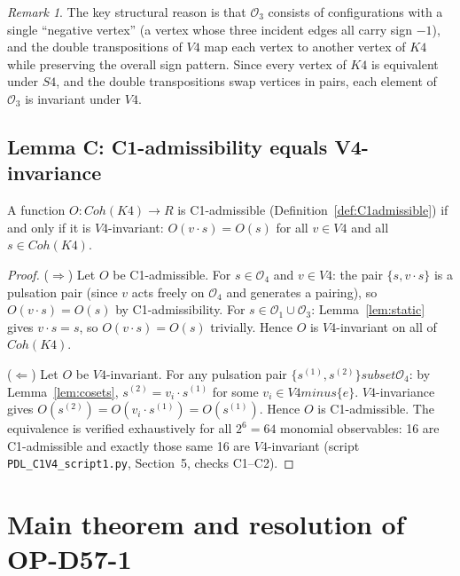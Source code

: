 \documentclass[11pt,a4paper]{article}
\def\Sfour{S4}%
\def\Vfour{V4}%
\def\Kfour{K4}%
\def\setminus{ minus }%
\def\subset{ subset }%
\def\mathbb#1{#1}%
\def\mathrm#1{#1}%
\newenvironment{lemmabox}[1][]{%
  \begin{tcolorbox}[lemmastyle,title={Lemma\ifx\relax#1\relax\else: #1\fi}]}
  {\end{tcolorbox}}
\theoremstyle{plain}
\theoremstyle{definition}
\theoremstyle{remark}
\newtheorem{remark}[theorem]{Remark}
\newcommand{\Kfour}{K_4}
\newcommand{\Sfour}{S_4}
\newcommand{\Vfour}{V_4}
\newcommand{\Coh}{\mathrm{Coh}}
\newcommand{\Orb}[1]{\mathcal{O}_{#1}}
\begin{document}
\begin{remark}
The key structural reason is that $\Orb{3}$ consists of configurations with a single
``negative vertex'' (a vertex whose three incident edges all carry sign $-1$), and the
double transpositions of $\Vfour$ map each vertex to another vertex of $\Kfour$ while
preserving the overall sign pattern. Since every vertex of $\Kfour$ is equivalent under
$\Sfour$, and the double transpositions swap vertices in pairs, each element of $\Orb{3}$
is invariant under $\Vfour$.
\end{remark}

\subsection{Lemma C: C1-admissibility equals V4-invariance}

\begin{lemmabox}[C1-admissibility $=$ $\Vfour$-invariance on $\Coh(\Kfour)$]
\label{lem:C}
A function $O : \Coh(\Kfour) \to \mathbb{R}$ is C1-admissible
(Definition~\ref{def:C1admissible}) if and only if it is $\Vfour$-invariant: $O(v \cdot s) = O(s)$
for all $v \in \Vfour$ and all $s \in \Coh(\Kfour)$.
\end{lemmabox}

\begin{proof}
($\Rightarrow$) Let $O$ be C1-admissible. For $s \in \Orb{4}$ and $v \in \Vfour$: the pair
$\{s, v \cdot s\}$ is a pulsation pair (since $v$ acts freely on $\Orb{4}$ and generates
a pairing), so $O(v \cdot s) = O(s)$ by C1-admissibility. For $s \in \Orb{1} \cup \Orb{3}$:
Lemma~\ref{lem:static} gives $v \cdot s = s$, so $O(v \cdot s) = O(s)$ trivially. Hence
$O$ is $\Vfour$-invariant on all of $\Coh(\Kfour)$.

($\Leftarrow$) Let $O$ be $\Vfour$-invariant. For any pulsation pair $\{s^{(1)}, s^{(2)}\}
\subset \Orb{4}$: by Lemma~\ref{lem:cosets}, $s^{(2)} = v_i \cdot s^{(1)}$ for some
$v_i \in \Vfour \setminus \{e\}$. $\Vfour$-invariance gives $O(s^{(2)}) = O(v_i \cdot s^{(1)})
= O(s^{(1)})$. Hence $O$ is C1-admissible. The equivalence is verified exhaustively for all
$2^6 = 64$ monomial observables: 16 are C1-admissible and exactly those same 16 are
$\Vfour$-invariant (script \texttt{PDL\_C1V4\_script1.py}, Section~5, checks C1--C2).
\end{proof}

\section{Main theorem and resolution of OP-D57-1}
\label{sec:main}
\end{document}
